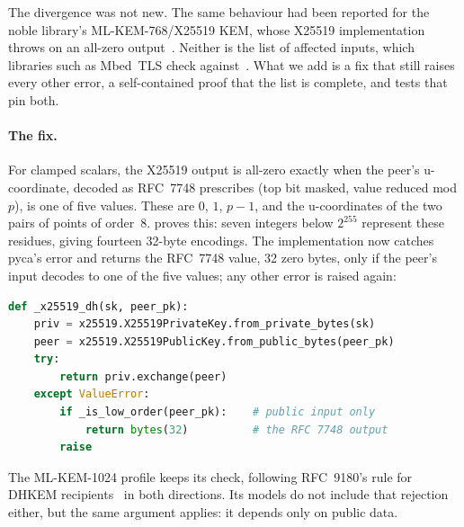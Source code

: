The divergence was not new. The same behaviour had been reported for the
noble library's ML-KEM-768/X25519 KEM, whose X25519 implementation throws on
an all-zero output~\cite{Noble26}. Neither is the list of affected inputs,
which libraries such as Mbed~TLS check against~\cite{mbedtls}. What we add is
a fix that still raises every other error, a self-contained proof that the
list is complete, and tests that pin both.

\paragraph{The fix.} For clamped scalars, the X25519 output is all-zero
exactly when the peer's u-coordinate, decoded as RFC~7748 prescribes (top bit
masked, value reduced mod $p$), is one of five values. These are $0$, $1$,
$p-1$, and the u-coordinates of the two pairs of points of order~8.
 proves this: seven integers below $2^{255}$ represent
these residues, giving fourteen 32-byte encodings. The implementation now
catches pyca's error and returns the RFC~7748 value, 32 zero bytes, only if
the peer's input decodes to one of the five values; any other error is
raised again:
\begin{lstlisting}[language=Python,morekeywords={try,except,raise,def,return,if,in}]
def _x25519_dh(sk, peer_pk):
    priv = x25519.X25519PrivateKey.from_private_bytes(sk)
    peer = x25519.X25519PublicKey.from_public_bytes(peer_pk)
    try:
        return priv.exchange(peer)
    except ValueError:
        if _is_low_order(peer_pk):    # public input only
            return bytes(32)          # the RFC 7748 output
        raise
\end{lstlisting}
The ML-KEM-1024 profile keeps its check, following RFC~9180's rule for DHKEM
recipients~\cite[\S7.1.4]{RFC9180} in both directions. Its models do not
include that rejection either, but the same argument applies: it depends
only on public data.

